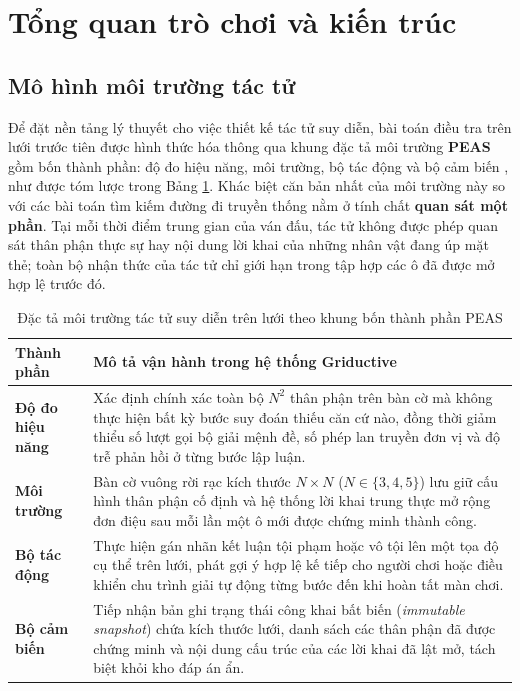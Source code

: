 \section{Tổng quan trò chơi và kiến trúc}
\label{sec:architecture}

\subsection{Mô hình môi trường tác tử}
\label{subsec:peas}
Để đặt nền tảng lý thuyết cho việc thiết kế tác tử suy diễn, bài toán điều tra
trên lưới trước tiên được hình thức hóa thông qua khung đặc tả môi trường
\textbf{PEAS} gồm bốn thành phần: độ đo hiệu năng, môi trường, bộ tác động và bộ
cảm biến \cite{russell2020aima}, như được tóm lược trong Bảng
\ref{tab:peas_griductive}. Khác biệt căn bản nhất của môi trường này so với các
bài toán tìm kiếm đường đi truyền thống nằm ở tính chất \textbf{quan sát một
phần}. Tại mỗi thời điểm trung gian của ván đấu, tác tử không được phép quan sát
thân phận thực sự hay nội dung lời khai của những nhân vật đang úp mặt thẻ; toàn
bộ nhận thức của tác tử chỉ giới hạn trong tập hợp các ô đã được mở hợp lệ trước
đó.

\begin{table}[H]
\centering
\caption{Đặc tả môi trường tác tử suy diễn trên lưới theo khung bốn thành phần PEAS}
\label{tab:peas_griductive}
\small
\begin{tabularx}{\textwidth}{l >{\raggedright\arraybackslash}X}
\toprule
\textbf{Thành phần} & \textbf{Mô tả vận hành trong hệ thống Griductive} \\
\midrule
\textbf{Độ đo hiệu năng} &
Xác định chính xác toàn bộ $N^2$ thân phận trên bàn cờ mà không thực hiện bất kỳ
bước suy đoán thiếu căn cứ nào, đồng thời giảm thiểu số lượt gọi bộ giải mệnh đề,
số phép lan truyền đơn vị và độ trễ phản hồi ở từng bước lập luận. \\
\midrule
\textbf{Môi trường} &
Bàn cờ vuông rời rạc kích thước $N \times N$ ($N \in \{3, 4, 5\}$) lưu giữ cấu
hình thân phận cố định và hệ thống lời khai trung thực mở rộng đơn điệu sau mỗi
lần một ô mới được chứng minh thành công. \\
\midrule
\textbf{Bộ tác động} &
Thực hiện gán nhãn kết luận tội phạm hoặc vô tội lên một tọa độ cụ thể trên
lưới, phát gợi ý hợp lệ kế tiếp cho người chơi hoặc điều khiển chu trình giải tự
động từng bước đến khi hoàn tất màn chơi. \\
\midrule
\textbf{Bộ cảm biến} &
Tiếp nhận bản ghi trạng thái công khai bất biến (\textit{immutable snapshot}) chứa
kích thước lưới, danh sách các thân phận đã được chứng minh và nội dung cấu trúc
của các lời khai đã lật mở, tách biệt khỏi kho đáp án ẩn. \\
\bottomrule
\end{tabularx}
\end{table}

